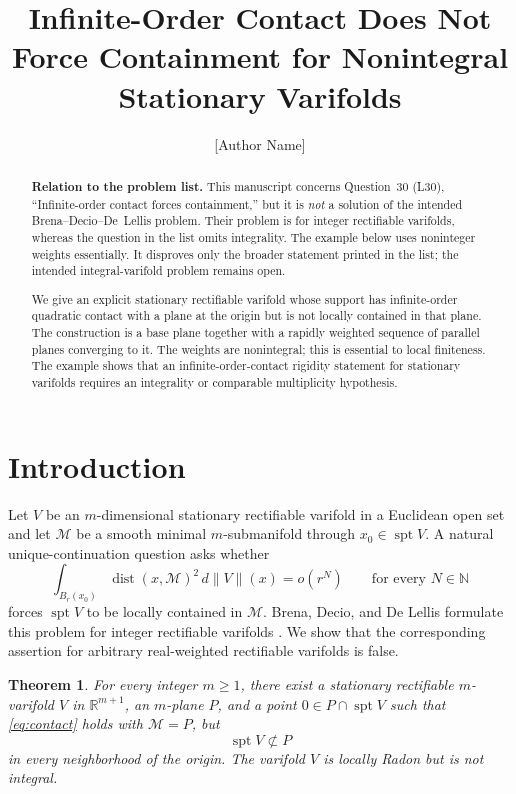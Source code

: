 \documentclass[11pt]{article}
\title{Infinite-Order Contact Does Not Force Containment for Nonintegral Stationary Varifolds}
\author{[Author Name]}
\date{}
\newtheorem{theorem}{Theorem}
\theoremstyle{remark}
\newcommand{\spt}{\operatorname{spt}}
\begin{document}
\maketitle

\begin{abstract}
\textbf{Relation to the problem list.}
This manuscript concerns Question~30 (L30), ``Infinite-order contact forces
containment,'' but it is \emph{not} a solution of the intended
Brena--Decio--De~Lellis problem.  Their problem is for integer rectifiable
varifolds, whereas the question in the list omits integrality.  The example
below uses noninteger weights essentially.  It disproves only the broader
statement printed in the list; the intended integral-varifold problem remains
open.

We give an explicit stationary rectifiable varifold whose support has
infinite-order quadratic contact with a plane at the origin but is not
locally contained in that plane.  The construction is a base plane together
with a rapidly weighted sequence of parallel planes converging to it.  The
weights are nonintegral; this is essential to local finiteness.  The example
shows that an infinite-order-contact rigidity statement for stationary
varifolds requires an integrality or comparable multiplicity hypothesis.
\end{abstract}

\section{Introduction}

Let $V$ be an $m$-dimensional stationary rectifiable varifold in a Euclidean
open set and let $\mathcal M$ be a smooth minimal $m$-submanifold through
$x_0\in\spt V$.  A natural unique-continuation question asks whether
\begin{equation}\label{eq:contact}
 \int_{B_r(x_0)}\operatorname{dist}(x,\mathcal M)^2\,d\|V\|(x)
 =o(r^N)
 \qquad\text{for every }N\in\mathbb N
\end{equation}
forces $\spt V$ to be locally contained in $\mathcal M$.  Brena, Decio,
and De Lellis formulate this problem for integer rectifiable varifolds
\cite{BDD}.  We show that the corresponding assertion for arbitrary
real-weighted rectifiable varifolds is false.

\begin{theorem}\label{thm:main}
For every integer $m\ge1$, there exist a stationary rectifiable
$m$-varifold $V$ in $\mathbb R^{m+1}$, an $m$-plane $P$, and a point
$0\in P\cap\spt V$ such that \eqref{eq:contact} holds with
$\mathcal M=P$, but
\[
 \spt V\not\subset P
\]
in every neighborhood of the origin.  The varifold $V$ is locally Radon
but is not integral.
\end{theorem}
\end{document}
